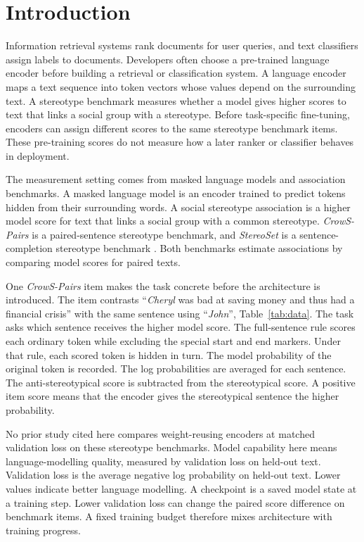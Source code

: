 \documentclass[sigconf,natbib=true,anonymous=true]{acmart}
\begin{document}
\section{Introduction}
\label{sec:intro-bundle}

Information retrieval systems rank documents for user queries, and text
classifiers assign labels to documents. Developers often choose a pre-trained
language encoder before building a retrieval or classification system. A
language encoder maps a text sequence into token vectors whose values depend on
the surrounding text. A stereotype benchmark measures whether a model gives
higher scores to text that links a social group with a stereotype. Before
task-specific fine-tuning, encoders can assign different scores to the same
stereotype benchmark items. These pre-training scores do not measure how a later
ranker or classifier behaves in deployment.

The measurement setting comes from masked language models and association
benchmarks. A masked language model is an encoder trained to predict tokens
hidden from their surrounding words. A social stereotype association is a higher
model score for text that links a social group with a common stereotype.
\emph{CrowS-Pairs} is a paired-sentence stereotype benchmark, and
\emph{StereoSet} is a sentence-completion stereotype benchmark
\citep{nangia2020crows,nadeem2021stereoset}. Both benchmarks estimate
associations by comparing model scores for paired texts.

One \emph{CrowS-Pairs} item makes the task concrete before the architecture is
introduced. The item contrasts ``\emph{Cheryl} was bad at saving money and thus
had a financial crisis'' with the same sentence using ``\emph{John}'',
Table~\ref{tab:data}. The task asks which sentence receives the higher model
score. The full-sentence rule scores each ordinary token while excluding the
special start and end markers. Under that rule, each scored token is hidden in
turn. The model probability of the original token is recorded. The log
probabilities are averaged for each sentence. The anti-stereotypical score is
subtracted from the stereotypical score. A positive item score means that the
encoder gives the stereotypical sentence the higher probability.

No prior study cited here compares weight-reusing encoders at matched
validation loss on these stereotype benchmarks. Model capability here means
language-modelling quality, measured by validation loss on held-out text.
Validation loss is the average negative log probability on held-out text. Lower
values indicate better language modelling. A checkpoint is a saved model state
at a training step. Lower validation loss can change the paired score difference
on benchmark items. A fixed training budget therefore mixes architecture with
training progress.
\end{document}
